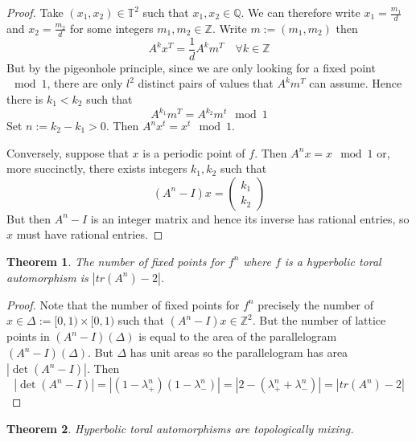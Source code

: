 \documentclass[11pt]{article}
\newcommand{\defeq}{:=}
\newcommand{\abs}[1]{|#1|}
\newcommand{\Z}{\mathbb{Z}}
\newcommand{\Q}{\mathbb{Q}}
\newtheorem{theorem}{Theorem}[section]
\begin{document}
\begin{proof}
Take $(x_1, x_2)\in\mathbb{T}^2$ such that $x_1, x_2\in\Q$.
We can therefore write $x_1=\frac{m_1}{d}$ and $x_2=\frac{m_2}{d}$ for some integers $m_1, m_2\in\Z$.
Write $m\defeq(m_1, m_2)$ then
\[
	A^k x^T = \frac{1}{d} A^k m^T\quad\forall k\in\Z
\]
But by the pigeonhole principle, since we are only looking for a fixed point $\mod 1$, there are only $l^2$ distinct pairs of values that $A^km^T$ can assume.
Hence there is $k_1 < k_2$ such that
\[
	A^{k_1}m^T = A^{k_2}m^t \mod 1
\]
Set $n\defeq k_2 - k_1 > 0 $.
Then $A^n x^t = x^t \mod 1$.

Conversely, suppose that $x$ is a periodic point of $f$.
Then $A^n x = x \mod 1$ or, more succinctly, there exists integers $k_1, k_2$ such that
\[
	(A^n - I) x =
	\begin{pmatrix}
	k_1 \\
	k_2
	\end{pmatrix}
\]
But then $A^n - I$ is an integer matrix and hence its inverse has rational entries, so $x$ must have rational entries.
\end{proof}

\begin{theorem}
The number of fixed points for $f^n$ where $f$ is a hyperbolic toral automorphism is $\abs{tr(A^n)-2}$.
\end{theorem}

\begin{proof}
Note that the number of fixed points for $f^n$ precisely the number of $x\in\Delta\defeq[0, 1) \times [0, 1)$ such that
$(A^n - I)x\in\Z^2$.
But the number of lattice points in $(A^n - I)(\Delta)$ is equal to the area of the parallelogram $(A^n -I)(\Delta)$.
But $\Delta$ has unit areas so the parallelogram has area $\abs{\det(A^n - I)}$.
Then
\[
	\abs{\det(A^n-I)} = \abs{(1-\lambda_+^n)(1-\lambda_-^n)} = \abs{2 - (\lambda_+^n + \lambda_-^n)} = \abs{tr(A^n) - 2}
\]
\end{proof}

\begin{theorem}
Hyperbolic toral automorphisms are topologically mixing.
\end{theorem}
\end{document}
